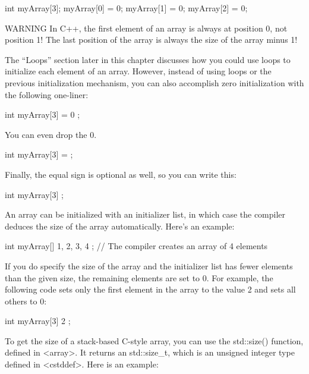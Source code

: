 \begin{cpp}
int myArray[3];
myArray[0] = 0;
myArray[1] = 0;
myArray[2] = 0;
\end{cpp}

\begin{myWarning}{WARNING}
In C++, the first element of an array is always at position 0, not position 1! The last position of the array is always the size of the array minus 1!
\end{myWarning}

The “Loops” section later in this chapter discusses how you could use loops to initialize each element of an array. However, instead of using loops or the previous initialization mechanism, you can also accomplish zero initialization with the following one-liner:

\begin{cpp}
int myArray[3] = { 0 };
\end{cpp}

You can even drop the 0.

\begin{cpp}
int myArray[3] = {};
\end{cpp}

Finally, the equal sign is optional as well, so you can write this:

\begin{cpp}
int myArray[3] {};
\end{cpp}

An array can be initialized with an initializer list, in which case the compiler deduces the size of the array automatically. Here’s an example:

\begin{cpp}
int myArray[] { 1, 2, 3, 4 }; // The compiler creates an array of 4 elements
\end{cpp}

If you do specify the size of the array and the initializer list has fewer elements than the given size, the remaining elements are set to 0. For example, the following code sets only the first element in the array to the value 2 and sets all others to 0:

\begin{cpp}
int myArray[3] { 2 };
\end{cpp}

To get the size of a stack-based C-style array, you can use the std::size() function, defined in <array>. It returns an std::size\_t, which is an unsigned integer type defined in <cstddef>. Here is an example:


